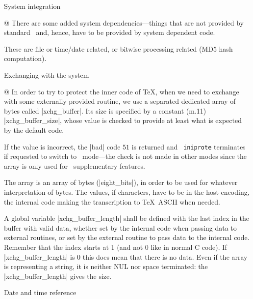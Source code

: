 
\enddiv %

\begindiv System integration

@ There are some added system dependencies---things that are not
provided by standard \PASCAL\ and, hence, have to be provided by system
dependent code.

These are file or time/date related, or bitwise processing related
(MD5 hash computation).

\begindiv Exchanging with the system

@ In order to try to protect the inner code of \TeX, when we need to
exchange with some externally provided routine, we use a separated
dedicated array of
bytes called |xchg_buffer|. Its size is specified by a constant (m.11)
|xchg_buffer_size|, whose value is checked to provide at least what is
expected by the default code.

If the value is incorrect, the |bad| code $51$ is returned and {\tt
iniprote} terminates if requested to switch to \Prote\ mode---the check
is not made in other modes since the array is only used for \Prote\
supplementary features.

The array is an array of bytes (|eight_bits|), in order to be used for
whatever interpretation of bytes. The values, if characters, have to be
in the host encoding, the internal code making the transcription to
\TeX\ ASCII when needed.

A global variable |xchg_buffer_length| shall be defined with the
last index in the buffer with valid data, whether set by the internal
code when passing data to external routines, or set by the external
routine to pass data to the internal code. Remember that the index
starts at $1$ (and not $0$ like in normal C code). If |xchg_buffer_length|
is $0$ this does mean that there is no data. Even if the array is
representing a string, it is neither NUL nor space terminated: the
|xchg_buffer_length| gives the size.

\enddiv %

\begindiv Date and time reference

